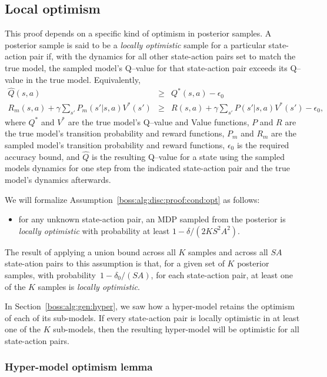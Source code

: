 \subsection{Local optimism}
\label{boss:alg:disc:proof:opt}
This proof depends on a specific kind of optimism in posterior samples. A posterior sample is said to be a \emph{locally optimistic} sample for a particular state-action pair if, with the dynamics for all other state-action pairs set to match the true model, the sampled model's Q--value for that state-action pair exceeds its Q--value in the true model. Equivalently,
\begin{eqnarray}
\label{boss:alg:disc:proof:opt}\hat Q(s,a) &\geq& Q^*(s, a) - \epsilon_0\\
R_m(s,a) +\gamma \sum_{s'} P_m(s'|s,a) V^*(s')&\geq&R(s,a) +\gamma \sum_{s'} P(s'|s,a) V^*(s') - \epsilon_0,
\end{eqnarray}
where $Q^*$ and $V^*$ are the true model's Q--value and Value functions, $P$ and $R$ are the true model's transition probability and reward functions, $P_m$ and $R_m$ are the sampled model's transition probability and reward functions, $\epsilon_0$ is the required accuracy bound, and $\hat Q$ is the resulting Q--value for a state using the sampled models dynamics for one step from the indicated state-action pair and the true model's dynamics afterwards.

We will formalize Assumption~\ref{boss:alg:disc:proof:cond:opt} as follows:
\begin{itemize}
\item for any unknown state-action pair, an MDP sampled from the posterior is \emph{locally optimistic} with probability at least $1-\delta/(2 K S^2 A^2)$.
\end{itemize}

The result of applying a union bound across all $K$ samples and across all $S A$ state-ation pairs to this assumption is that, for a given set of $K$ posterior samples, with probability~$1-\delta_0/(S A)$, for each state-action pair, at least one of the $K$ samples is \emph{locally optimistic}.

In Section~\ref{boss:alg:gen:hyper}, we saw how a hyper-model retains the optimism of each of its sub-models. If every state-action pair is locally optimistic in at least one of the $K$ sub-models, then the resulting hyper-model will be optimistic for all state-action pairs.

\subsubsection{Hyper-model optimism lemma}
\label{boss:alg:disc:proof:opt}

